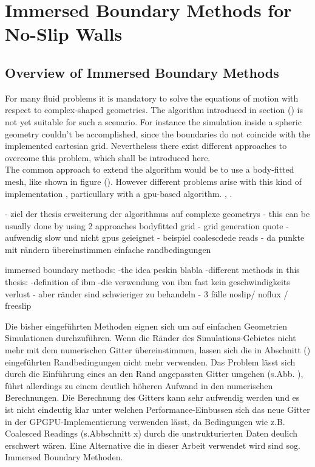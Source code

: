 
\chapter{Immersed Boundary Methods for No-Slip Walls}

\section{Overview of Immersed Boundary Methods}

For many fluid problems it is mandatory to solve the equations of motion with respect to complex-shaped geometries.
The algorithm introduced in section () is not yet suitable for such a scenario.
For instance the simulation inside a spheric geometry couldn't be accomplished, since the boundaries
do not coincide with the implemented cartesian grid. Nevertheless there exist different approaches to overcome this problem,
which shall be introduced here. \\
The common approach to extend the algorithm would be to use a body-fitted mesh, like shown in figure ().
However different problems arise with this kind of implementation \citep{Mittal2005}, particullary with a gpu-based algorithm.
\citet{Mittal2005}, \citet{Tilgner2012}.




- ziel der thesis erweiterung der algorithmus auf complexe geometrys
- this can be usually done by using 2 approaches
    bodyfitted grid
    - grid generation quote
    - aufwendig slow und nicht gpus geieignet
    - beispiel coalescdede reads
    - da punkte mit rändern übereinstimmen einfache randbedingungen



    immersed boundary methods:
    -the idea peskin blabla
    -different methods
    in this thesis:
    -definition of ibm
    -die verwendung von ibm fast kein geschwindigkeits verlust
    - aber ränder sind schwieriger zu behandeln
    - 3 fälle noslip/ noflux / freeslip

Die bisher eingeführten Methoden eignen sich um auf einfachen Geometrien Simulationen durchzuführen.
Wenn die Ränder des Simulations-Gebietes nicht mehr mit dem numerischen Gitter übereinstimmen, lassen
sich die in Abschnitt () eingeführten Randbedingungen nicht mehr verwenden.
Das Problem lässt sich durch die Einführung eines an den Rand angepassten Gitter umgehen (s.Abb. \label{fig:f1}),
führt allerdings zu einem deutlich höheren Aufwand in den numerischen Berechnungen.
Die Berechnung des Gitters kann sehr aufwendig werden und es ist nicht eindeutig klar unter welchen
Performance-Einbussen sich das neue Gitter in der GPGPU-Implementierung verwenden lässt, da Bedingungen wie
z.B. Coalesced Readings  (s.Abbschnitt x) durch die unstrukturierten Daten deulich erschwert wären.
Eine Alternative die in dieser Arbeit verwendet wird sind  sog. Immersed Boundary Methoden.


